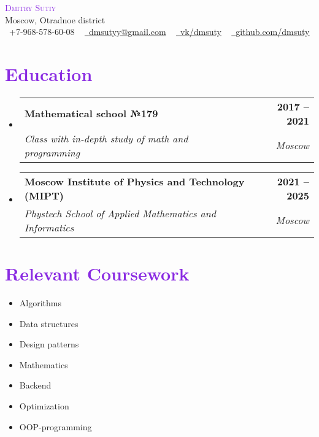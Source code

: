 \documentclass[letterpaper,11pt]{article}
\makeatletter
\newcommand{\resumeSubheading}[4]{
  \vspace{-2pt}\item
    \begin{tabular*}{1.0\textwidth}[t]{l@{\extracolsep{\fill}}r}
      \textbf{#1} & \textbf{\small #2} \\
      \textit{\small#3} & \textit{\small #4} \\
    \end{tabular*}\vspace{-7pt}
}
\newcommand{\resumeSubHeadingListStart}{\begin{itemize}[leftmargin=0.0in, label={}]}
\newcommand{\resumeSubHeadingListEnd}{\end{itemize}}
\makeatother
\begin{document}

\begin{center}
    \textcolor{BlueViolet}{\Huge \scshape Dmitry Sutiy} \\ \vspace{1pt}
    Moscow, Otradnoe district \\ \vspace{1pt}
    \small \raisebox{-0.1\height}\faPhone\ +7-968-578-60-08 ~ \href{mailto:dmsutyy@gmail.com}{\raisebox{-0.2\height}\faEnvelope\  \underline{dmsutyy@gmail.com}} ~ 
    \href{https://vk.com/dmsuty}{\raisebox{-0.2\height}\faVk\ \underline{vk/dmsuty}}  ~
    \href{https://github.com/}{\raisebox{-0.2\height}\faGithub\ \underline{github.com/dmsuty}}
    \vspace{-8pt}
\end{center}


\section{\textcolor{BlueViolet}{Education}}
  \resumeSubHeadingListStart
    \resumeSubheading
      {Mathematical school №179}{2017 -- 2021}
      {Class with in-depth study of math and programming}{Moscow}
    \resumeSubheading
      {Moscow Institute of Physics and Technology (MIPT)}{2021 -- 2025}
      {Phystech School of Applied Mathematics and Informatics}{Moscow}
  \resumeSubHeadingListEnd

\section{\textcolor{BlueViolet}{Relevant Coursework}}
        \begin{multicols}{4}
            \begin{itemize}[itemsep=-5pt, parsep=3pt]
                \item Algorithms
                \item Data structures
                \item Design patterns
                \item Mathematics
                \item Backend
                \item Optimization
                \item OOP-programming
                
            \end{itemize}
        \end{multicols}
        \vspace*{2.0\multicolsep}
\end{document}
